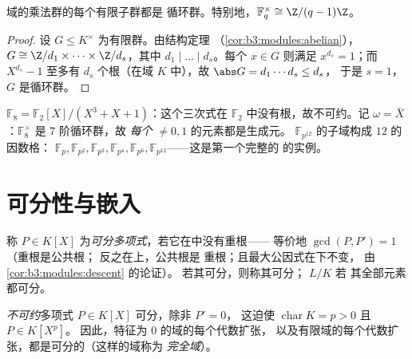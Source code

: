\begin{theorem}[循环性]\label{thm:b3:galois:cyclic}
域的乘法群的每个有限子群都是
循环群。特别地，$\mathbb F_q^\times \cong
\Z/(q-1)\Z$。
\end{theorem}

\begin{proof}
设 $G \leq K^\times$ 为有限群。由结构定理
（\cref{cor:b3:modules:abelian}），$G \cong \Z/d_1 \times \dots
\times \Z/d_s$，其中 $d_1 \mid \dots \mid d_s$。每个 $x \in G$
则满足 $x^{d_s} = 1$；而 $X^{d_s} - 1$ 至多有
$d_s$ 个根（在域 $K$ 中），故 $\abs G = d_1\cdots d_s \leq d_s$，
于是 $s = 1$，$G$ 是循环群。
\end{proof}

\begin{example}\label{ex:b3:galois:f8}
$\mathbb F_8 = \mathbb F_2[X]/(X^3 + X + 1)$：这个三次式在
$\mathbb F_2$ 中没有根，故不可约。记 $\omega =
\bar X$：$\mathbb F_8^\times$ 是 $7$ 阶循环群，故
\emph{每个} $\neq 0, 1$ 的元素都是生成元。
$\mathbb F_{p^{12}}$ 的子域构成 $12$ 的因数格：
$\mathbb F_p, \mathbb F_{p^2}, \mathbb F_{p^3}, \mathbb F_{p^4},
\mathbb F_{p^6}, \mathbb F_{p^{12}}$——这是第一个完整的
的实例。
\end{example}

\section{可分性与嵌入}

\begin{definition}\label{def:b3:galois:separable}
称 $P \in K[X]$ 为\emph{可分多项式}，若它在中没有重根——
等价地 $\gcd(P, P') = 1$（重根是公共根；
反之在上，公共根是
重根；且最大公因式在下不变，
由 \cref{cor:b3:modules:descent} 的论证）。
若其可分，则称其可分； $L/K$ 若
其全部元素都可分。
\end{definition}

\begin{proposition}\label{prop:b3:galois:perfect}
\emph{不可约}多项式 $P \in K[X]$ 可分，除非 $P' = 0$，
这迫使 $\operatorname{char} K = p > 0$ 且 $P \in K[X^p]$。
因此，特征为 $0$ 的域的每个代数扩张，
以及有限域的每个代数扩张，都是可分的（这样的域称为
\emph{完全域}）。
\end{proposition}

